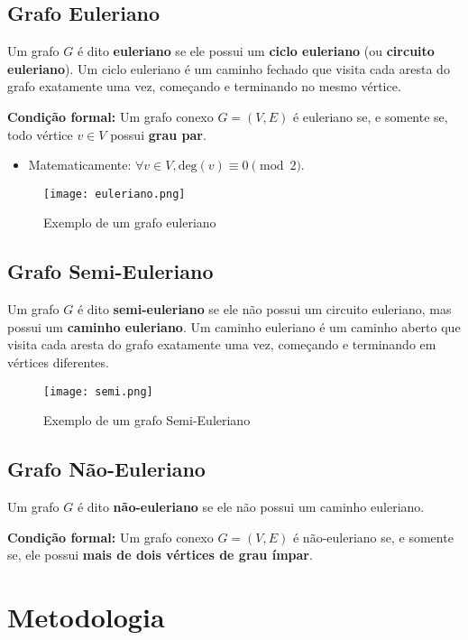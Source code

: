 \documentclass[12pt]{article}
\begin{document}
\subsection{Grafo Euleriano}
Um grafo $G$ \'e dito \textbf{euleriano} se ele possui um \textbf{ciclo euleriano} (ou \textbf{circuito euleriano}). Um ciclo euleriano \'e um caminho fechado que visita cada aresta do grafo exatamente uma vez, come\c{c}ando e terminando no mesmo v\'ertice.

\textbf{Condi\c{c}\~ao formal:} Um grafo conexo $G=(V,E)$ \'e euleriano se, e somente se, todo v\'ertice $v \in V$ possui \textbf{grau par}.
\begin{itemize}
    \item Matematicamente: $\forall v \in V, \text{deg}(v) \equiv 0 \pmod{2}$.
\end{itemize}

\begin{figure}[ht]
\centering
\texttt{[image: euleriano.png]}
\caption{Exemplo de um grafo euleriano}
\label{fig:exampleFig3}
\end{figure}

\newpage

\subsection{Grafo Semi-Euleriano}
Um grafo $G$ \'e dito \textbf{semi-euleriano} se ele n\~ao possui um circuito euleriano, mas possui um \textbf{caminho euleriano}. Um caminho euleriano \'e um caminho aberto que visita cada aresta do grafo exatamente uma vez, come\c{c}ando e terminando em v\'ertices diferentes.

\begin{figure}[ht]
\centering
\texttt{[image: semi.png]}
\caption{Exemplo de um grafo Semi-Euleriano}
\end{figure}

\subsection{Grafo N\~ao-Euleriano}
Um grafo $G$ \'e dito \textbf{n\~ao-euleriano} se ele n\~ao possui um caminho euleriano.


\textbf{Condi\c{c}\~ao formal:} Um grafo conexo $G=(V,E)$ \'e n\~ao-euleriano se, e somente se, ele possui \textbf{mais de dois v\'ertices de grau \'impar}.

\section{Metodologia}
\end{document}

